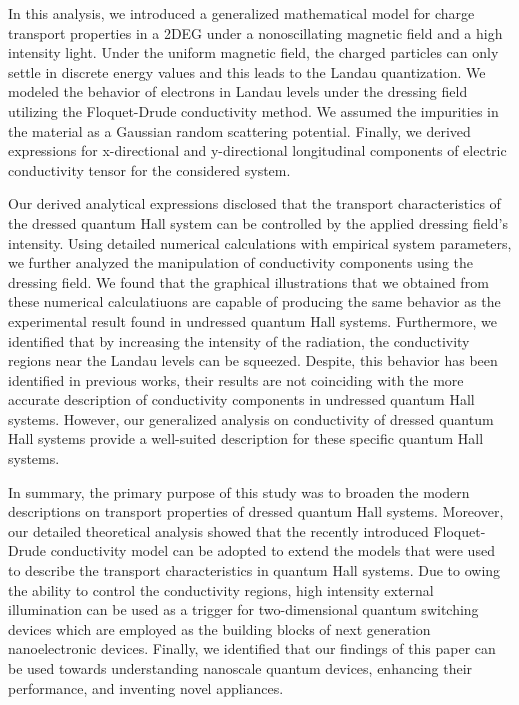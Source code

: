 In this analysis, we introduced a generalized mathematical model for charge transport properties in a 2DEG under a nonoscillating magnetic field and a high intensity light. Under the uniform magnetic field, the charged particles can only settle in discrete energy values and this leads to the Landau quantization. We modeled the behavior of electrons in Landau levels under the dressing field utilizing the Floquet-Drude conductivity method. We assumed the impurities in the material as a Gaussian random scattering potential. Finally, we derived expressions for x-directional and y-directional longitudinal components of electric conductivity tensor for the considered system.

Our derived analytical expressions disclosed that the transport characteristics of the dressed quantum Hall system can be controlled by the applied dressing field’s intensity. Using detailed numerical calculations with empirical system parameters, we further analyzed the manipulation of conductivity components using the dressing field.
We found that the graphical illustrations that we obtained from these numerical calculatiuons are capable of producing the same behavior as the experimental  result found in undressed quantum Hall systems.
Furthermore, we identified that by increasing the intensity of the radiation, the conductivity regions near the Landau levels can be squeezed. Despite, this behavior has been identified in previous works, their results are not coinciding with the more accurate description of conductivity components in undressed quantum Hall systems. However, our generalized analysis on conductivity of dressed quantum Hall systems provide a well-suited description for these specific quantum Hall systems.

In summary, the primary purpose of this study was to broaden the modern descriptions on transport properties of dressed quantum Hall systems. Moreover, our detailed theoretical analysis showed that the recently introduced Floquet-Drude conductivity model can be adopted to extend the models that were used to describe the transport characteristics in quantum Hall systems. Due to owing the ability to control the conductivity regions, high intensity external illumination can be used as a trigger for two-dimensional quantum switching devices which are employed as the building blocks of next generation nanoelectronic devices. Finally, we identified that our findings of this paper can be used towards understanding nanoscale quantum devices, enhancing their performance, and inventing novel appliances.
